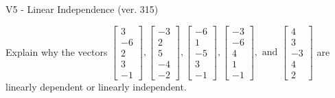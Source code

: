 \begin{exercise}
  \begin{exerciseTitle}V5 - Linear Independence (ver. 315)\end{exerciseTitle}
  \begin{exerciseStatement}
    Explain why the vectors \(\left[\begin{array}{r}
3 \\
-6 \\
2 \\
3 \\
-1
\end{array}\right] , \left[\begin{array}{r}
-3 \\
2 \\
5 \\
-4 \\
-2
\end{array}\right] , \left[\begin{array}{r}
-6 \\
1 \\
-5 \\
3 \\
-1
\end{array}\right] , \left[\begin{array}{r}
-3 \\
-6 \\
4 \\
1 \\
-1
\end{array}\right] , \text{ and } \left[\begin{array}{r}
4 \\
3 \\
-3 \\
4 \\
2
\end{array}\right]\) are linearly dependent or linearly independent.	



\end{exerciseStatement}
\end{exercise}
